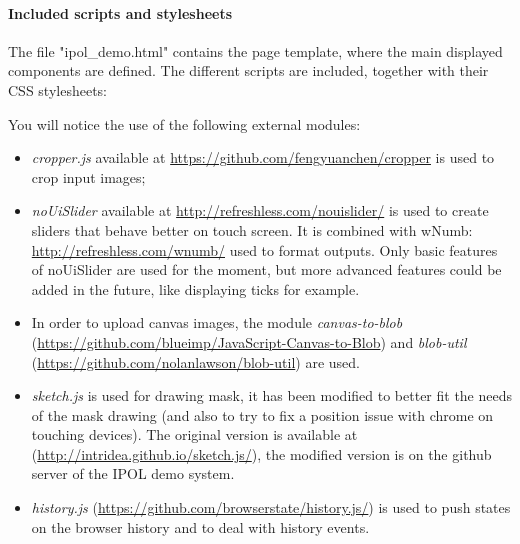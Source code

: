 \paragraph{Included scripts and stylesheets}
The file "ipol\_demo.html" contains the page template, where the main displayed components are defined.
The different scripts are included, together with their CSS stylesheets:



You will notice the use of the following external modules:
\begin{itemize}
 \item \emph{cropper.js} available at 
        \url{https://github.com/fengyuanchen/cropper} is used to crop input 
        images; 
 \item \emph{noUiSlider} available at 
        \url{http://refreshless.com/nouislider/} is used to create sliders that
        behave better on touch screen. It is combined with wNumb: 
        \url{http://refreshless.com/wnumb/} used to format outputs.
        Only basic features of noUiSlider are used for the moment, but more 
        advanced features could be added in the future, like displaying ticks 
        for example.
  \item In order to upload canvas images, the module 
        \emph{canvas-to-blob} 
        (\url{https://github.com/blueimp/JavaScript-Canvas-to-Blob}) and 
        \emph{blob-util} (\url{https://github.com/nolanlawson/blob-util}) are 
        used.
  \item \emph{sketch.js} is used for drawing mask, it has been 
        modified to better fit the needs of the mask drawing (and also to try 
        to fix a position issue with chrome on touching devices). The original   
        version is available at (\url{http://intridea.github.io/sketch.js/}), 
        the modified version is on the github server of the IPOL demo system.
  \item \emph{history.js} (\url{https://github.com/browserstate/history.js/}) is 
        used to push states on the browser history and to deal with  
        history events.
\end{itemize}

